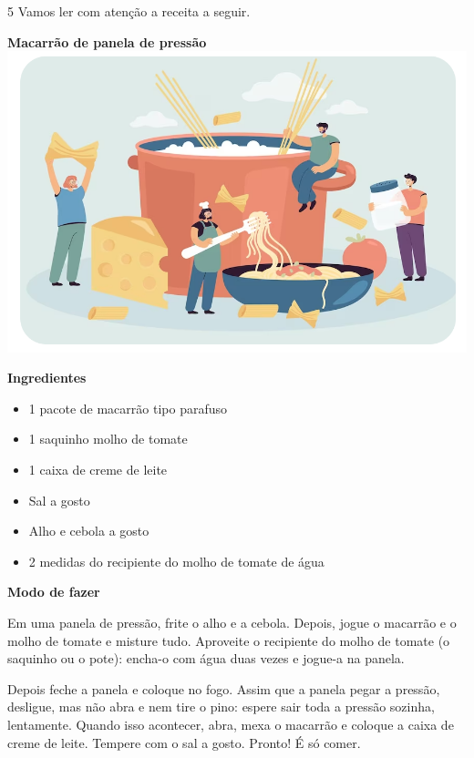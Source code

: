 \num{5} Vamos ler com atenção a receita a seguir.


\begin{myquote}
\begin{center}
\textbf{Macarrão de panela de pressão}
\noindent\includegraphics[width=.8\textwidth]{media/image184.png}\bigskip
\end{center}
\textbf{Ingredientes}
\begin{itemize}
\item 1 pacote de macarrão tipo parafuso

\item 1 saquinho molho de tomate

\item 1 caixa de creme de leite

\item Sal a gosto

\item Alho e cebola a gosto

\item 2 medidas do recipiente do molho de tomate de água

\end{itemize}

\textbf{Modo de fazer}

Em uma panela de pressão, frite o alho e a cebola. Depois, jogue o
macarrão e o molho de tomate e misture tudo. Aproveite o recipiente
do molho de tomate (o saquinho ou o pote): encha-o com água duas vezes
e jogue-a na panela.

Depois feche a panela e coloque no fogo. Assim que a panela pegar a
pressão, desligue, mas não abra e nem tire o pino: espere sair toda 
a pressão sozinha, lentamente. Quando isso acontecer, abra, mexa o
macarrão e coloque a caixa de creme de leite. Tempere com o sal a gosto.
Pronto! É só comer. 
\end{myquote}

